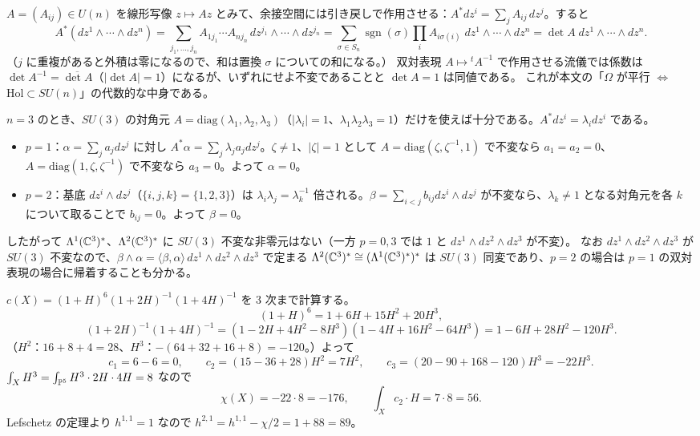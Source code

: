 $A = (A_{ij})\in U(n)$ を線形写像 $z\mapsto Az$ とみて、余接空間には引き戻しで作用させる：$A^*dz^i = \sum_jA_{ij}\,dz^j$。すると
\[
A^*(dz^1\wedge\cdots\wedge dz^n) = \sum_{j_1,\dots,j_n}A_{1j_1}\cdots A_{nj_n}\,dz^{j_1}\wedge\cdots\wedge dz^{j_n}
= \sum_{\sigma\in S_n}\operatorname{sgn}(\sigma)\prod_iA_{i\sigma(i)}\;dz^1\wedge\cdots\wedge dz^n = \det A\;dz^1\wedge\cdots\wedge dz^n .
\]
（$j$ に重複があると外積は零になるので、和は置換 $\sigma$ についての和になる。）
双対表現 $A\mapsto{}^tA^{-1}$ で作用させる流儀では係数は $\det A^{-1} = \overline{\det A}$（$|\det A| = 1$）になるが、いずれにせよ不変であることと $\det A = 1$ は同値である。
これが本文の「$\Omega$ が平行 $\Leftrightarrow$ $\mathrm{Hol}\subset SU(n)$」の代数的な中身である。

$n=3$ のとき、$SU(3)$ の対角元 $A = \mathrm{diag}(\lambda_1,\lambda_2,\lambda_3)$（$|\lambda_i| = 1$、$\lambda_1\lambda_2\lambda_3 = 1$）だけを使えば十分である。$A^*dz^i = \lambda_idz^i$ である。
\begin{itemize}
\item $p=1$：$\alpha = \sum_ja_jdz^j$ に対し $A^*\alpha = \sum_j\lambda_ja_jdz^j$。$\zeta\ne1$、$|\zeta| = 1$ として $A = \mathrm{diag}(\zeta,\zeta^{-1},1)$ で不変なら $a_1 = a_2 = 0$、$A = \mathrm{diag}(1,\zeta,\zeta^{-1})$ で不変なら $a_3 = 0$。よって $\alpha = 0$。
\item $p=2$：基底 $dz^i\wedge dz^j$（$\{i,j,k\} = \{1,2,3\}$）は $\lambda_i\lambda_j = \lambda_k^{-1}$ 倍される。$\beta = \sum_{i<j}b_{ij}dz^i\wedge dz^j$ が不変なら、$\lambda_k\neq1$ となる対角元を各 $k$ について取ることで $b_{ij} = 0$。よって $\beta = 0$。
\end{itemize}
したがって $\Lambda^1(\mathbb{C}^3)^*$、$\Lambda^2(\mathbb{C}^3)^*$ に $SU(3)$ 不変な非零元はない（一方 $p=0,3$ では $1$ と $dz^1\wedge dz^2\wedge dz^3$ が不変）。
なお $dz^1\wedge dz^2\wedge dz^3$ が $SU(3)$ 不変なので、$\beta\wedge\alpha = \langle\beta,\alpha\rangle\,dz^1\wedge dz^2\wedge dz^3$ で定まる $\Lambda^2(\mathbb{C}^3)^*\cong(\Lambda^1(\mathbb{C}^3)^*)^*$ は $SU(3)$ 同変であり、$p=2$ の場合は $p=1$ の双対表現の場合に帰着することも分かる。

$c(X) = (1+H)^6(1+2H)^{-1}(1+4H)^{-1}$ を 3 次まで計算する。
\[
(1+H)^6 = 1+6H+15H^2+20H^3,
\]
\[
(1+2H)^{-1}(1+4H)^{-1} = (1-2H+4H^2-8H^3)(1-4H+16H^2-64H^3) = 1-6H+28H^2-120H^3 .
\]
（$H^2$：$16+8+4 = 28$、$H^3$：$-(64+32+16+8) = -120$。）よって
\[
c_1 = 6-6 = 0,\qquad c_2 = (15-36+28)H^2 = 7H^2,\qquad
c_3 = (20 - 90 + 168 - 120)H^3 = -22H^3 .
\]
$\int_XH^3 = \int_{\mathbb{P}^5}H^3\cdot2H\cdot4H = 8$ なので
\[
\chi(X) = -22\cdot8 = -176,\qquad \int_Xc_2\cdot H = 7\cdot8 = 56 .
\]
Lefschetz の定理より $h^{1,1} = 1$ なので $h^{2,1} = h^{1,1} - \chi/2 = 1+88 = 89$。

